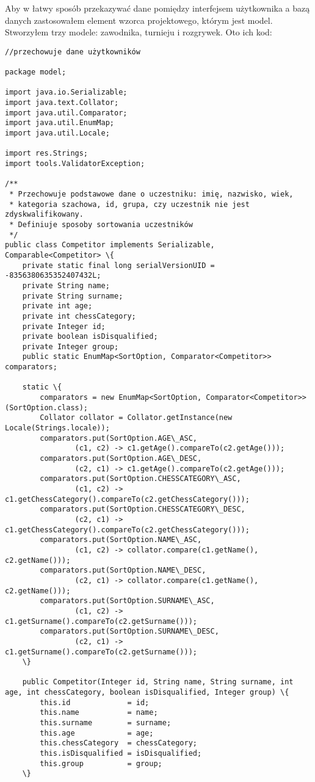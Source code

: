 Aby w łatwy sposób przekazywać dane pomiędzy interfejsem użytkownika a bazą danych zastosowałem element wzorca projektowego, którym jest model. Stworzyłem trzy modele: zawodnika, turnieju i rozgrywek. Oto ich kod:
\begin{verbatim}
//przechowuje dane użytkowników

package model;

import java.io.Serializable;
import java.text.Collator;
import java.util.Comparator;
import java.util.EnumMap;
import java.util.Locale;

import res.Strings;
import tools.ValidatorException;

/**
 * Przechowuje podstawowe dane o uczestniku: imię, nazwisko, wiek, 
 * kategoria szachowa, id, grupa, czy uczestnik nie jest zdyskwalifikowany. 
 * Definiuje sposoby sortowania uczestników
 */
public class Competitor implements Serializable, Comparable<Competitor> \{
	private static final long serialVersionUID = -8356380635352407432L;
	private String name;
    private String surname;
    private int age;
    private int chessCategory;
    private Integer id;
    private boolean isDisqualified;
    private Integer group;
    public static EnumMap<SortOption, Comparator<Competitor>> comparators;

    static \{
    	comparators = new EnumMap<SortOption, Comparator<Competitor>>(SortOption.class);
    	Collator collator = Collator.getInstance(new Locale(Strings.locale));
	    comparators.put(SortOption.AGE\_ASC, 
	    		(c1, c2) -> c1.getAge().compareTo(c2.getAge()));
		comparators.put(SortOption.AGE\_DESC, 
				(c2, c1) -> c1.getAge().compareTo(c2.getAge()));
		comparators.put(SortOption.CHESSCATEGORY\_ASC, 
				(c1, c2) -> c1.getChessCategory().compareTo(c2.getChessCategory()));
		comparators.put(SortOption.CHESSCATEGORY\_DESC, 
				(c2, c1) -> c1.getChessCategory().compareTo(c2.getChessCategory()));
		comparators.put(SortOption.NAME\_ASC, 
				(c1, c2) -> collator.compare(c1.getName(), c2.getName()));
		comparators.put(SortOption.NAME\_DESC, 
				(c2, c1) -> collator.compare(c1.getName(), c2.getName()));
		comparators.put(SortOption.SURNAME\_ASC, 
				(c1, c2) -> c1.getSurname().compareTo(c2.getSurname()));
		comparators.put(SortOption.SURNAME\_DESC, 
				(c2, c1) -> c1.getSurname().compareTo(c2.getSurname()));
    \}
    
    public Competitor(Integer id, String name, String surname, int age, int chessCategory, boolean isDisqualified, Integer group) \{
    	this.id 			= id;
        this.name 			= name;
        this.surname 		= surname;
        this.age 			= age;
        this.chessCategory 	= chessCategory;
        this.isDisqualified = isDisqualified;
        this.group			= group;
    \}
    

\end{verbatim}

